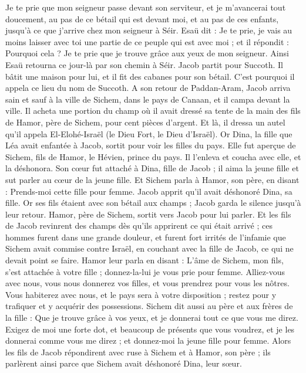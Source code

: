 \begin{multicols}{2}
Je te prie que mon seigneur passe devant son serviteur, et je m’avancerai tout doucement, au pas de ce bétail qui est devant moi, et au pas de ces enfants, jusqu'à ce que j'arrive chez mon seigneur à Séir.
Esaü dit : Je te prie, je vais au moins laisser avec toi une partie de ce peuple qui est avec moi ; et il répondit : Pourquoi cela ? Je te prie que je trouve grâce aux yeux de mon seigneur.
Ainsi Esaü  retourna ce jour-là par son chemin à Séir.
Jacob partit pour Succoth. Il bâtit une maison pour lui, et il fit des cabanes pour son bétail. C’est pourquoi il appela ce lieu du nom de Succoth.
A son retour de  Paddan-Aram, Jacob arriva sain et sauf à la ville de Sichem, dans le pays de Canaan, et il campa devant la ville.
Il acheta une portion du champ où il avait dressé sa tente de la main des fils de Hamor, père de Sichem, pour cent pièces d'argent.
Et là, il dressa un autel qu'il appela El-Elohé-Israël (le Dieu Fort, le Dieu d'Israël).
\VerseOne{}Or Dina, la fille que Léa avait enfantée à Jacob, sortit pour voir les filles du pays.
Elle fut aperçue de Sichem, fils de Hamor, le Hévien, prince du pays. Il l'enleva et coucha avec elle, et la déshonora.
Son cœur fut attaché à Dina, fille de Jacob ; il aima la jeune fille et sut parler au cœur de la jeune fille.
Et Sichem parla à Hamor, son père, en disant : Prends-moi cette fille pour femme.
Jacob apprit qu'il avait déshonoré Dina, sa fille. Or ses fils étaient avec son bétail aux champs ; Jacob garda le silence jusqu’à leur retour.
Hamor, père de Sichem, sortit vers Jacob pour lui  parler.
Et les fils de Jacob revinrent des champs dès qu’ils apprirent ce qui était arrivé ; ces hommes furent dans  une grande douleur, et furent fort irrités de l'infamie que Sichem avait commise contre Israël, en couchant avec la fille de Jacob, ce qui ne devait point se faire.
Hamor leur parla en disant : L’âme de Sichem, mon fils, s’est attachée à votre fille ; donnez-la-lui je vous prie pour femme.
Alliez-vous avec nous, vous nous donnerez vos filles, et vous prendrez pour vous les nôtres.
Vous habiterez avec nous, et le pays sera à votre disposition ; restez pour y trafiquer et y acquérir des possessions.
Sichem dit aussi au père et aux frères de la fille : Que je trouve grâce à vos yeux, et je donnerai tout ce que vous me direz.
Exigez de moi une forte dot, et beaucoup de présents que vous voudrez, et je les donnerai comme vous me direz ; et donnez-moi la jeune fille pour femme.
Alors les fils de Jacob répondirent avec ruse à Sichem et à Hamor, son père ; ils parlèrent ainsi parce que Sichem avait déshonoré Dina, leur sœur.

\end{multicols}
